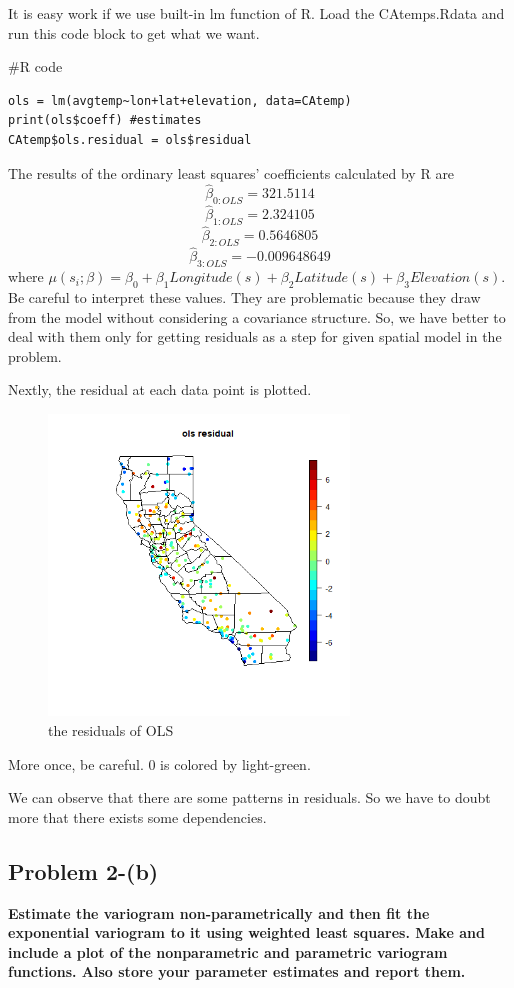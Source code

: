\documentclass{article}
\newenvironment{Rcode}%
{%
    \begin{mdframed}
    \#R code
    \begin{small}
}
{%
    \end{small}
    \end{mdframed}
}
\begin{document}
It is easy work if we use built-in lm function of R.
Load the CAtemps.Rdata and run this code block to get what we want.
\begin{Rcode}
    \begin{verbatim}
ols = lm(avgtemp~lon+lat+elevation, data=CAtemp)
print(ols$coeff) #estimates
CAtemp$ols.residual = ols$residual
    \end{verbatim}
\end{Rcode}
The results of the ordinary least squares' coefficients calculated by R are
\[\hat{\beta}_{0:OLS}=321.5114\]
\[\hat{\beta}_{1:OLS}=2.324105\]
\[\hat{\beta}_{2:OLS}=0.5646805\]
\[\hat{\beta}_{3:OLS}=-0.009648649\]
where \(\mu(s_i;\beta)=\beta_0+\beta_1 Longitude(s) + \beta_2 Latitude(s)+\beta_3 Elevation(s)\).
Be careful to interpret these values. 
They are problematic because they draw from the model without considering a covariance structure.
So, we have better to deal with them only for getting residuals as a step for given spatial model in the problem.


Nextly, the residual at each data point is plotted.
\begin{figure}[!h]
    \centering
    \includegraphics[height=8cm]{prob2_CAtemp_ols_residual.png}
    \caption{the residuals of OLS}
\end{figure}

More once, be careful. 0 is colored by light-green.

We can observe that there are some patterns in residuals. So we have to doubt more that there exists some dependencies.


\clearpage
\subsection{Problem 2-(b)}
\textbf{
Estimate the variogram non-parametrically and then fit the exponential variogram to it using weighted least squares.
Make and include a plot of the nonparametric and parametric variogram functions.
Also store your parameter estimates and report them.
}
\end{document}
